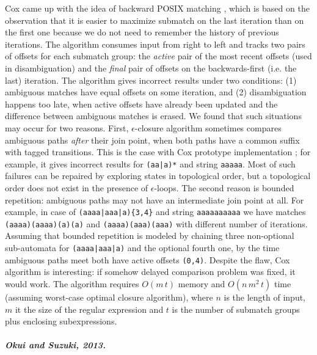 \documentclass[AMA,STIX1COL]{WileyNJD-v2}
\begin{document}
Cox came up with the idea of backward POSIX matching \cite{Cox09},
which is based on the observation that it is easier to maximize submatch on the last iteration than on the first one
because we do not need to remember the history of previous iterations.
The algorithm consumes input from right to left
and tracks two pairs of offsets for each submatch group:
the \emph{active} pair of the most recent offsets (used in disambiguation)
and the \emph{final} pair of offsets on the backwards-first (i.e. the last) iteration.
The algorithm gives incorrect results under two conditions:
(1) ambiguous matches have equal offsets on some iteration,
and (2) disambiguation happens too late, when active offsets have already been updated and the difference between ambiguous matches is erased.
We found that such situations may occur for two reasons.
First, $\epsilon$-closure algorithm sometimes compares ambiguous paths \emph{after} their join point,
when both paths have a common suffix with tagged transitions.
This is the case with Cox prototype implementation \cite{Cox09}; for example, it gives incorrect results for \texttt{(aa|a)*} and string \texttt{aaaaa}.
Most of such failures can be repaired by exploring states in topological order,
but a topological order does not exist in the presence of $\epsilon$-loops.
The second reason is bounded repetition: ambiguous paths may not have an intermediate join point at all.
For example, in case of \texttt{(aaaa|aaa|a)\{3,4\}} and string \texttt{aaaaaaaaaa}
we have matches \texttt{(aaaa)(aaaa)(a)(a)} and \texttt{(aaaa)(aaa)(aaa)}
with different number of iterations.
Assuming that bounded repetition is modeled by chaining three non-optional sub-automata for \texttt{(aaaa|aaa|a)} and the optional fourth one,
by the time ambiguous paths meet both have active offsets \texttt{(0,4)}.
Despite the flaw, Cox algorithm is interesting: if somehow delayed comparison problem was fixed, it would work.
The algorithm requires $O(m \, t)$ memory and $O(n \, m^2 \, t)$ time
(assuming worst-case optimal closure algorithm),
where $n$ is the length of input,
$m$ it the size of the regular expression
and $t$ is the number of submatch groups plus enclosing subexpressions.

\subparagraph{Okui and Suzuki, 2013.}
\end{document}
